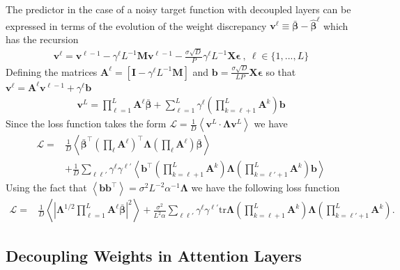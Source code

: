 \documentclass{article} %
\begin{document}
The predictor in the case of a noisy target function with decoupled layers can be expressed in terms of the evolution of the weight discrepancy $\bm v^\ell \equiv \bar{\bm\beta} - \hat{\bm\beta}^\ell$ which has the recursion
\begin{align}
    \bm v^{\ell} = \bm v^{\ell-1} - \gamma^\ell L^{-1} \bm M \bm v^{\ell-1} - \frac{\sigma \sqrt{D}}{P} \gamma^\ell L^{-1} \bm X \bm\epsilon   \  , \ \ell \in \{1,...,L\}
\end{align}
Defining the matrices $\bm A^\ell = \left[ \bm I - \gamma^\ell L^{-1} \bm M \right]$ and $\bm b = \frac{\sigma\sqrt D}{L P} \bm X \bm \epsilon$ so that $\bm v^\ell = \bm A^\ell \bm v^{\ell-1} + \gamma^\ell \bm b$
\begin{align}
    \bm v^L = \prod_{\ell=1}^L \bm A^\ell \bar{\bm\beta} + \sum_{\ell=1}^L \gamma^\ell \left( \prod_{k=\ell+1}^L \bm A^k \right) \bm b
\end{align}
Since the loss function takes the form $\mathcal L = \frac{1}{D} \left<  \bm v^L \cdot \bm \Lambda \bm v^L  \right>$ we have 
\begin{align}
    \mathcal L = &\frac{1}{D} \left< \bar{\bm\beta}^\top \left( \prod_{\ell} \bm A^\ell \right)^\top \bm\Lambda  \left( \prod_{\ell} \bm A^\ell \right) \bar{\bm\beta} \right> \nonumber
    \\
    &+ \frac{1}{D} \sum_{\ell \ell'} \gamma^\ell \gamma^{\ell'}  \left< \bm b^\top \left( \prod_{k=\ell+1}^L \bm A^k \right) \bm\Lambda \left( \prod_{k=\ell'+1}^L \bm A^k \right) \bm b \right>
\end{align}
Using the fact that $\left< \bm b \bm b^\top \right> = \sigma^2 L^{-2} \alpha^{-1} \bm\Lambda$ we have the following loss function
\begin{align}
    \mathcal L = &\frac{1}{D} \left< \left| \bm\Lambda^{1/2} \prod_{\ell=1}^L \bm A^\ell \bar{\bm\beta}  \right|^2 \right> + \frac{\sigma^2}{L^2 \alpha} \sum_{\ell \ell'} \gamma^\ell \gamma^{\ell'} \text{tr} \bm\Lambda \left( \prod_{k=\ell+1}^L \bm A^k \right) \bm\Lambda \left( \prod_{k=\ell'+1}^L \bm A^k \right) . 
\end{align}


\subsection{Decoupling Weights in Attention Layers}\label{app:decoupling_layers}
\end{document}
